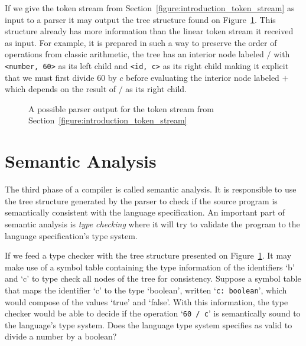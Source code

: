 \documentclass[
    oneside,
    english,
    embeddedlogo,
    noabntexcite
]{ufsc-thesis-rn46-2019}
\begin{document}
If we give the token stream from Section~\ref{figure:introduction_token_stream} as input to a parser it may output the tree structure found on Figure~\ref{figure:introduction_ast}.
This structure already has more information than the linear token stream it received as input.
For example, it is prepared in such a way to preserve the order of operations from classic arithmetic, the tree has an interior node labeled $/$ with \verb+<number, 60>+ as its left child and \verb+<id, c>+ as its right child making it explicit that we must first divide $60$ by $c$ before evaluating the interior node labeled $+$ which depends on the result of $/$ as its right child.

\begin{figure}[ht]\label{figure:introduction_ast}
    \centering
    \caption{A possible parser output for the token stream from Section~\ref{figure:introduction_token_stream}}
\end{figure}

\section{Semantic Analysis}\label{chapter:background:sec:semantic}

The third phase of a compiler is called semantic analysis.
It is responsible to use the tree structure generated by the parser to check if the source program is semantically consistent with the language specification.
An important part of semantic analysis is \textit{type checking} where it will try to validate the program to the language specification's type system.

If we feed a type checker with the tree structure presented on Figure~\ref{figure:introduction_ast}.
It may make use of a symbol table containing the type information of the identifiers `b' and `c' to type check all nodes of the tree for consistency.
Suppose a symbol table that maps the identifier `c' to the type `boolean', written `\verb+c: boolean+', which would compose of the values `true' and `false'.
With this information, the type checker would be able to decide if the operation `\verb+60 / c+' is semantically sound to the language's type system.
Does the language type system specifies as valid to divide a number by a boolean?
\end{document}
